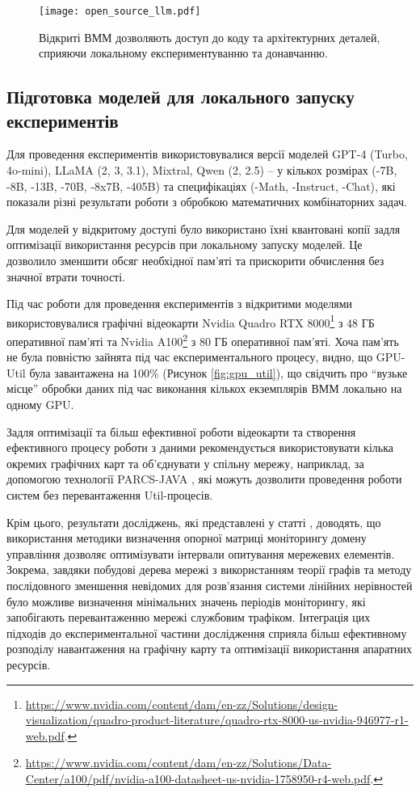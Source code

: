 \begin{figure}[h]
    \centering
    \texttt{[image: open\_source\_llm.pdf]}
    \caption{Відкриті ВММ дозволяють доступ до коду та архітектурних деталей, сприяючи локальному експериментуванню та донавчанню.}
    \label{fig:open_source_llm_ua}
\end{figure}

\subsection{Підготовка моделей для локального запуску експериментів}

Для проведення експериментів використовувалися версії моделей GPT-4 (Turbo, 4o-mini), LLaMA (2, 3, 3.1), Mixtral, Qwen (2, 2.5) -- у кількох розмірах (-7B, -8B, -13B, -70B, -8x7B, -405B) та специфікаціях (-Math, -Instruct, -Chat), які показали різні результати роботи з обробкою математичних комбінаторних задач.

Для моделей у відкритому доступі було використано їхні квантовані копії задля оптимізації використання ресурсів при локальному запуску моделей. Це дозволило зменшити обсяг необхідної пам'яті та прискорити обчислення без значної втрати точності.

Під час роботи для проведення експериментів з відкритими моделями використовувалися графічні відеокарти Nvidia Quadro RTX 8000\footnote{\url{https://www.nvidia.com/content/dam/en-zz/Solutions/design-visualization/quadro-product-literature/quadro-rtx-8000-us-nvidia-946977-r1-web.pdf}.} з 48 ГБ оперативної пам’яті та Nvidia A100\footnote{\url{https://www.nvidia.com/content/dam/en-zz/Solutions/Data-Center/a100/pdf/nvidia-a100-datasheet-us-nvidia-1758950-r4-web.pdf}.} з 80 ГБ оперативної пам’яті. Хоча пам'ять не була повністю зайнята під час експериментального процесу, видно, що GPU-Util була завантажена на 100\% (Рисунок \ref{fig:gpu_util}), що свідчить про ``вузьке місце'' обробки даних під час виконання кількох екземплярів ВММ локально на одному GPU.

Задля оптимізації та більш ефективної роботи відеокарти та створення ефективного процесу роботи з даними рекомендується використовувати кілька окремих графічних карт та об'єднувати у спільну мережу, наприклад, за допомогою технології PARCS-JAVA \cite{Anisimov2005}, які можуть дозволити проведення роботи систем без перевантаження Util-процесів.

Крім цього, результати досліджень, які представлені у статті \cite{vlasenko2019methodology}, доводять, що використання методики визначення опорної матриці моніторингу домену управління дозволяє оптимізувати інтервали опитування мережевих елементів. Зокрема, завдяки побудові дерева мережі з використанням теорії графів та методу послідовного зменшення невідомих для розв’язання системи лінійних нерівностей було можливе визначення мінімальних значень періодів моніторингу, які запобігають перевантаженню мережі службовим трафіком. Інтеграція цих підходів до експериментальної частини дослідження сприяла більш ефективному розподілу навантаження на графічну карту та оптимізації використання апаратних ресурсів.

